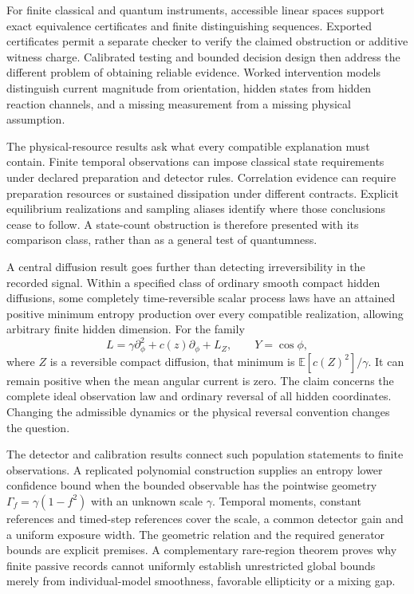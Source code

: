 For finite classical and quantum instruments, accessible linear spaces
support exact equivalence certificates and finite distinguishing sequences.
Exported certificates permit a separate checker to verify the claimed
obstruction or additive witness charge. Calibrated testing and bounded
decision design then address the different problem of obtaining reliable
evidence. Worked intervention models distinguish current magnitude from
orientation, hidden states from hidden reaction channels, and a missing
measurement from a missing physical assumption.

The physical-resource results ask what every compatible explanation must
contain. Finite temporal observations can impose classical state requirements
under declared preparation and detector rules. Correlation evidence can
require preparation resources or sustained dissipation under different
contracts. Explicit equilibrium realizations and sampling aliases identify
where those conclusions cease to follow. A state-count obstruction is
therefore presented with its comparison class, rather than as a general
test of quantumness.

A central diffusion result goes further than detecting irreversibility in
the recorded signal. Within a specified class of ordinary smooth compact
hidden diffusions, some completely time-reversible scalar process laws have
an attained positive minimum entropy production over every compatible
realization, allowing arbitrary finite hidden dimension. For the family
\[
 L=\gamma\partial_\phi^2+c(z)\partial_\phi+L_Z,
 \qquad Y=\cos\phi,
\]
where $Z$ is a reversible compact diffusion, that minimum is
$\mathbb E[c(Z)^2]/\gamma$. It can remain positive when the mean angular
current is zero. The claim concerns the complete ideal observation law and
ordinary reversal of all hidden coordinates. Changing the admissible dynamics
or the physical reversal convention changes the question.

The detector and calibration results connect such population statements to
finite observations. A replicated polynomial construction supplies an entropy
lower confidence bound when the bounded observable has the pointwise geometry
$\Gamma_f=\gamma(1-f^2)$ with an unknown scale $\gamma$. Temporal moments,
constant references and timed-step references cover the scale, a common
detector gain and a uniform exposure width. The geometric relation and the
required generator bounds are explicit premises. A complementary rare-region
theorem proves why finite passive records cannot uniformly establish
unrestricted global bounds merely from individual-model smoothness, favorable
ellipticity or a mixing gap.

